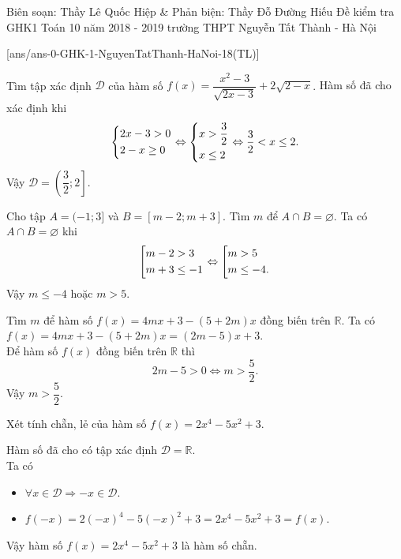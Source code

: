 \begin{name}
{Biên soạn: Thầy Lê Quốc Hiệp \& Phản biện: Thầy Đỗ Đường Hiếu}
{Đề kiểm tra GHK1 Toán 10 năm 2018 - 2019 trường THPT Nguyễn Tất Thành - Hà Nội}
\end{name}

\setcounter{ex}{0}\setcounter{bt}{0}
[ans/ans-0-GHK-1-NguyenTatThanh-HaNoi-18(TL)]
\begin{bt}%
	Tìm tập xác định $\mathscr{D}$ của hàm số $f(x)=\dfrac{x^2-3}{\sqrt{2x-3}}+2\sqrt{2-x}$.
	\loigiai
	{
		Hàm số đã cho xác định khi
		\[\left\{\begin{aligned}&2x-3>0\\&2-x\ge0\end{aligned}\right.\Leftrightarrow\left\{\begin{aligned}&x>\dfrac{3}{2}\\&x\le2\end{aligned}\right.\Leftrightarrow \dfrac{3}{2}<x\le2.\]
		Vậy $\mathscr{D}=\left(\dfrac{3}{2};2\right]$.
	}
\end{bt}

\begin{bt}%
	Cho tập $A=(-1;3]$ và $B=[m-2;m+3]$. Tìm $m$ để $A\cap B=\varnothing$.
	\loigiai
	{
		Ta có $A\cap B=\varnothing$ khi
		\[\left[\begin{aligned}&m-2>3\\&m+3\le-1\end{aligned}\right.\Leftrightarrow\left[\begin{aligned}&m>5\\&m\le-4.\end{aligned}\right.\]
		Vậy $m\le-4$ hoặc $m>5$.
	}
\end{bt}

\begin{bt}%
	Tìm $m$ để hàm số $f(x)=4mx+3-(5+2m)x$ đồng biến trên $\mathbb{R}$.
	\loigiai
	{
		Ta có $f(x)=4mx+3-(5+2m)x=(2m-5)x+3$.\\
		Để hàm số $f(x)$ đồng biến trên $\mathbb{R}$ thì
		\[2m-5>0\Leftrightarrow m>\dfrac{5}{2}.\]
		Vậy $m>\dfrac{5}{2}$.
	}
\end{bt}

\begin{bt}%
	Xét tính chẵn, lẻ của hàm số $f(x)=2x^4-5x^2+3$.
	\loigiai
	{
		Hàm số đã cho có tập xác định $\mathscr{D}=\mathbb{R}$.\\
		Ta có
		\begin{itemize}
			\item $\forall x\in\mathscr{D}\Rightarrow -x\in\mathscr{D}$.
			\item $f(-x)=2(-x)^4-5(-x)^2+3=2x^4-5x^2+3=f(x)$.
		\end{itemize}
	Vậy hàm số $f(x)=2x^4-5x^2+3$ là hàm số chẵn.
	}
\end{bt}

